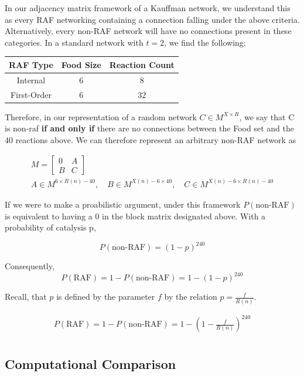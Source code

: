 \documentclass{article}
\begin{document}
In our adjacency matrix framework of a Kauffman network, we understand this as every RAF networking containing a connection falling under the above criteria.
Alternatively, every non-RAF network will have no connections present in these categories.
In a standard network with $t = 2$, we find the following:

\begin{center}
    \begin{tabular}{ | c || c| c| } 
      \hline
      \textbf{RAF Type} & \textbf{Food Size}  & \textbf{Reaction Count}\\ 
      \hline
      Internal &  6 & 8 \\ 
      First-Order &  6 & 32 \\ 
      \hline
\end{tabular}
\end{center}

Therefore, in our representation of a random network $C \in M^{X \times R}$, we say that C is non-raf \textbf{if and only if} there are no connections between the Food set and the 40 reactions above.
We can therefore represent an arbitrary non-RAF network as

\begin{gather*}
M = \begin{bmatrix}
    0 & A \\
    B & C
\end{bmatrix} \\
A \in M^{ 6 \times R(n) - 40}, \quad B \in M^{X(n) - 6 \times  40}, \quad C \in M^{X(n) - 6 \times R(n) - 40}
\end{gather*}


If we were to make a proabilistic argument, under this framework $ P(\text{non-RAF})$ is equivalent to having a 0 in the block matrix designated above. 
With a probability of catalysis p, 

$$
P(\text{non-RAF}) = (1 - p)^{240}
$$


Consequently, 
$$
P(\text{RAF}) = 1 - P(\text{non-RAF}) = 1 - (1 - p)^{240}
$$

Recall, that $p$ is defined by the parameter $f$ by the relation $p = \frac{f}{R(n)}$.

\begin{gather*}
    P(\text{RAF}) = 1 - P(\text{non-RAF}) = 1 - \left(1 - \frac{f}{R(n)} \right)^{240} \\
\end{gather*}




\subsection{Computational Comparison}
\end{document}
